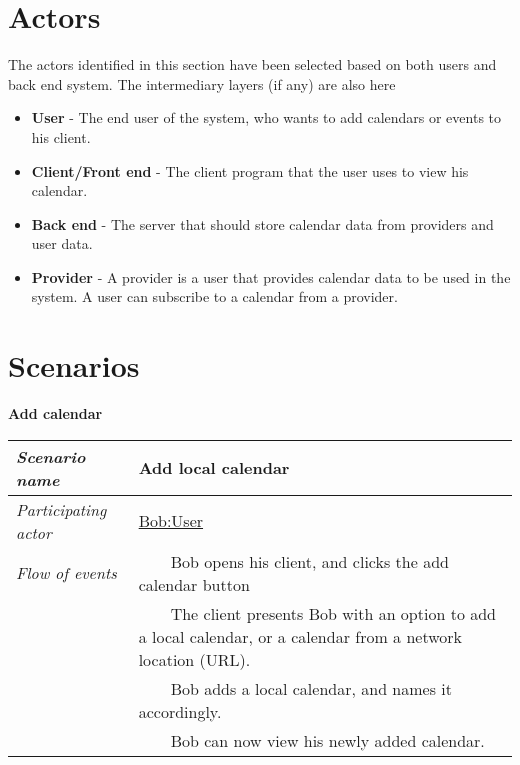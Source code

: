 \documentclass[10pt]{report}
\newcommand{\tabitem}{~~\llap{\textbullet}~~}
\numberwithin{equation}{section} %
\numberwithin{figure}{section} %
\numberwithin{table}{section} %
\begin{document}
\section{Actors}
The actors identified in this section have been selected based on both users and
back end system. The intermediary layers (if any) are also here
\begin{itemize}
\item \textbf{User} - The end user of the system, who wants to add calendars or
  events to his client.
\item \textbf{Client/Front end} - The client program that the user uses to view
  his calendar.
\item \textbf{Back end} - The server that should store calendar data from
  providers and user data.
\item \textbf{Provider} - A provider is a user that provides calendar data to be
  used in the system. A user can subscribe to a calendar from a provider.
\end{itemize}

\section{Scenarios}
\begin{table}[H]
\noindent \textbf{Add calendar}\\
\begin{tabularx}{\textwidth}{l X}
\midrule
\textit{Scenario name} & Add local calendar \\ \midrule
\textit{Participating actor} & \underline{Bob:User} \\ \midrule
\textit{Flow of events} & \tabitem Bob opens his client, and clicks the add
                                       calendar button \\
                                       & \tabitem The client presents Bob with
                                       an option to add a local calendar, or a
                                       calendar from a network location (URL). \\
                                       & \tabitem Bob adds a local calendar, and
                                       names it accordingly. \\
                                       & \tabitem Bob can now view his newly
                                       added calendar. \\
                                       \midrule
\end{tabularx}
\end{table}
\end{document}
